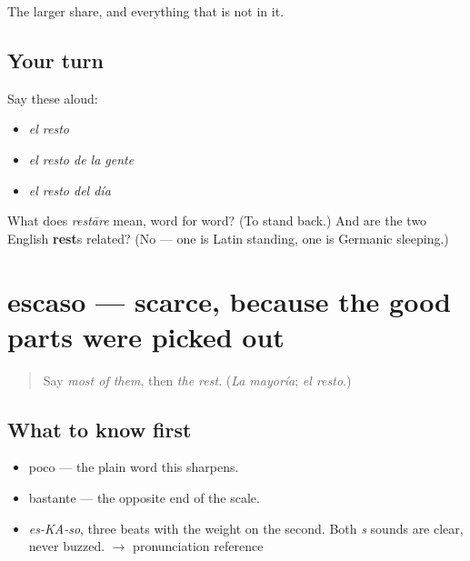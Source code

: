 \begin{grammarlens}[title={What you've built}]
The larger share, and everything that is not in it.
\end{grammarlens}

\subsection*{Your turn}
Say these aloud:

\begin{itemize}
\raggedright
  \item \emph{el resto}
  \item \emph{el resto de la gente}
  \item \emph{el resto del día}
\end{itemize}

\begin{tcolorbox}[breakable,colback=teal!4,colframe=teal!35!black,title={Before you move on}]
What does \emph{restāre} mean, word for word? (To stand back.) And are the two English \textbf{rest}s related? (No — one is Latin standing, one is Germanic sleeping.)
\end{tcolorbox}
\section[escaso]{escaso — scarce, because the good parts were picked out}

\label{lesson:ES-C352-escaso}



\begin{quote}
Say \emph{most of them}, then \emph{the rest}. (\emph{La mayoría}; \emph{el resto}.)
\end{quote}

\subsection*{What to know first}
\begin{itemize}
\raggedright
  \item poco — the plain word this sharpens.
  \item bastante — the opposite end of the scale.
\end{itemize}

\begin{sounds}
\begin{itemize}
\raggedright
  \item \emph{es-KA-so}, three beats with the weight on the second. Both \emph{s} sounds are clear, never buzzed. $\to$ pronunciation reference
\end{itemize}
\end{sounds}

